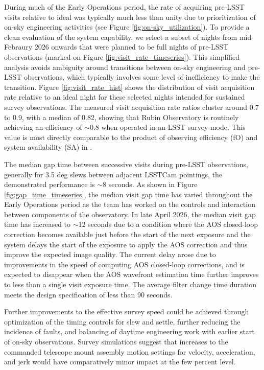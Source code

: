\documentclass[OPS,lsst,authoryear,toc]{lsstdoc}
\begin{document}
During much of the Early Operations period, the rate of acquiring pre-LSST visits relative to ideal was typically much less than unity due to prioritization of on-sky engineering activities (see Figure \ref{fig:on-sky_utilization}).
To provide a clean evaluation of the system capability, we select a subset of nights from mid-Febraury 2026 onwards that were planned to be full nights of pre-LSST observations (marked on Figure \ref{fig:visit_rate_timeseries}).
This simplified analysis avoids ambiguity around transitions between on-sky engineering and pre-LSST observations, which typically involves some level of inefficiency to make the transition.
Figure \ref{fig:visit_rate_hist} shows the distribution of visit acquisition rate relative to an ideal night for these selected nights intended for sustained survey observations.
The measured visit acquisition rate ratios cluster around 0.7 to 0.9, with a median of 0.82, showing that Rubin Observatory is routinely achieving an efficiency of $\sim$0.8 when operated in an LSST survey mode.
This value is most directly comparable to the product of observing efficiency (fO) and system availability (SA) in \cite{RTN-093}.

The median gap time between successive visits during pre-LSST observations, generally for 3.5 deg slews between adjacent LSSTCam pointings, the demonstrated performance is $\sim$8 seconds.
As shown in Figure \ref{fig:gap_time_timeseries}, the median visit gap time has varied throughout the Early Operations period as the team has worked on the controls and interaction between components of the observatory.
In late April 2026, the median visit gap time has increased to $\sim$12 seconds due to a condition where the AOS closed-loop correction becomes available just before the start of the next exposure and the system delays the start of the exposure to apply the AOS correction and thus improve the expected image quality.
The current delay arose due to improvements in the speed of computing AOS closed-loop corrections, and is expected to disappear when the AOS wavefront estimation time further improves to less than a single visit exposure time.
The average filter change time duration meets the design specification of less than 90 seconds.

Further improvements to the effective survey speed could be achieved through optimization of the timing controls for slew and settle, further reducing the incidence of faults, and balancing of daytime engineering work with earlier start of on-sky observations.
Survey simulations suggest that increases to the commanded telescope mount assembly motion settings for velocity, acceleration, and jerk would have comparatively minor impact at the few percent level.
\end{document}

